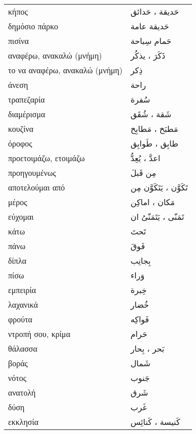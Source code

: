 \documentclass[twocolumn,a4paper]{article}
\newcommand{\ar}[1]{\textarabic{#1}}
\newcommand{\pl}{\raisebox{0.15ex}{\footnotesize ◍}}
\newcommand{\vrf}{\raisebox{0.15ex}{\footnotesize ◉}}
\newcommand{\mas}{\raisebox{0.15ex}{\footnotesize ◫}}
\begin{document}
\begin{mpsupertabular}{ P{0.5\textwidth} P{0.5\textwidth} }
κήπος \pl                    & \ar{ حَديقة ، حَدائق } \\
δημόσιο πάρκο                & \ar{ حَديقة عامة } \\
πισίνα                       & \ar{ حَمام سِباحة } \\
αναφέρω, ανακαλώ (μνήμη) \vrf  & \ar{ ذَكَرَ ، يذكُر } \\ %
το να αναφέρω, ανακαλώ (μνήμη) \mas    & \ar{ ذِكر } \\
άνεση                        & \ar{ راحة } \\
τραπεζαρία                   & \ar{ سُفرة } \\
διαμέρισμα \pl               & \ar{ شَقة ، شُقَق} \\
κουζίνα \pl                  & \ar{ مَطبَخ ، مَطابِخ } \\
όροφος \pl                   & \ar{ طابِق ، طَوابِق } \\
προετοιμάζω, ετοιμάζω \vrf   & \ar{ اعدَّ ، يُعِدُّ } \\ %
προηγουμένως                 & \ar{ مِن قَبلَ } \\
αποτελούμαι από \vrf         & \ar{ تَكَوَّن ، يَتَكَوَّن مِن } \\ %
μέρος \pl                    & \ar{ مَكان ، اماكِن } \\
εύχομαι \vrf                 & \ar{ تَمَنّى ، يَتَمَنّىُ ان } \\ %
κάτω                         & \ar{ تَحتَ } \\
πάνω                         & \ar{ فَوقَ } \\
δίπλα                        & \ar{ بِجانِب } \\
πίσω                         & \ar{ وَراء } \\
εμπειρία                     & \ar{ خِبرة } \\
λαχανικά                     & \ar{ خُضار } \\
φρούτα                       & \ar{ فَواكِه } \\
ντροπή σου, κρίμα            & \ar{ حَرام } \\
θάλασσα \pl                  & \ar{ بَحر ، بِحار } \\
βοράς                        & \ar{ شَمال } \\
νότος                        & \ar{ جَنوب } \\
ανατολή                      & \ar{ شَرق } \\
δύση                         & \ar{ غَرب } \\
εκκλησία \pl                 & \ar{ كَنيسة ، كَنائِس } \\


\end{mpsupertabular}
\end{document}
